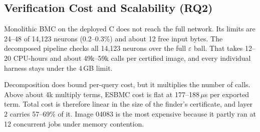 \subsection{Verification Cost and Scalability (RQ2)}
\begin{table}[t]
\centering
\caption{Formal-verification cost. Monolithic rows run ESBMC directly on the verbatim deployed C (validation image, 5\,GB limit). The other rows are the decomposed pipeline. ESBMC time is summed CPU time. Peak is host RSS over all concurrent jobs. n.r.: not recorded.}
\label{tab:cost}
%
\end{table}

Monolithic BMC on the deployed C does not reach the full network. Its limits are 24--48 of 14,123 neurons (0.2--0.3\%) and about 12 free input bytes. The decomposed pipeline checks all 14,123 neurons over the full $\varepsilon$ ball. That takes 12--20 CPU-hours and about 49k--59k calls per certified image, and every individual harness stays under the 4\,GB limit.

Decomposition does bound per-query cost, but it multiplies the number of calls. Above about 4k multiply terms, ESBMC cost is flat at 177--188\,$\mu$s per exported term. Total cost is therefore linear in the size of the finder's certificate, and layer 2 carries 57--69\% of it. Image 04083 is the most expensive because it partly ran at 12 concurrent jobs under memory contention.

